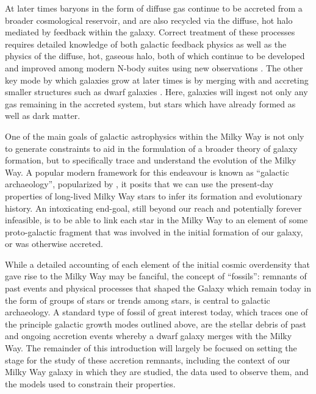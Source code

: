 At later times baryons in the form of diffuse gas continue to be accreted from a broader cosmological reservoir, and are also recycled via the diffuse, hot halo mediated by feedback within the galaxy. Correct treatment of these processes requires detailed knowledge of both galactic feedback physics as well as the physics of the diffuse, hot, gaseous halo, both of which continue to be developed and improved among modern N-body suites using new observations \parencite[e.g.][]{crain23}. The other key mode by which galaxies grow at later times is by merging with and accreting smaller structures such as dwarf galaxies \parencite{lacey93}. Here, galaxies will ingest not only any gas remaining in the accreted system, but stars which have already formed as well as dark matter.

One of the main goals of galactic astrophysics within the Milky Way is not only to generate constraints to aid in the formulation of a broader theory of galaxy formation, but to specifically trace and understand the evolution of the Milky Way. A popular modern framework for this endeavour is known as ``galactic archaeology'', popularized by \textcite{freeman02}, it posits that we can use the present-day properties of long-lived Milky Way stars to infer its formation and evolutionary history. An intoxicating end-goal, still beyond our reach and potentially forever infeasible, is to be able to link each star in the Milky Way to an element of some proto-galactic fragment that was involved in the initial formation of our galaxy, or was otherwise accreted. 

While a detailed accounting of each element of the initial cosmic overdensity that gave rise to the Milky Way may be fanciful, the concept of ``fossils'': remnants of past events and physical processes that shaped the Galaxy which remain today in the form of groups of stars or trends among stars, is central to galactic archaeology. A standard type of fossil of great interest today, which traces one of the principle galactic growth modes outlined above, are the stellar debris of past and ongoing accretion events whereby a dwarf galaxy merges with the Milky Way. The remainder of this introduction will largely be focused on setting the stage for the study of these accretion remnants, including the context of our Milky Way galaxy in which they are studied, the data used to observe them, and the models used to constrain their properties.
